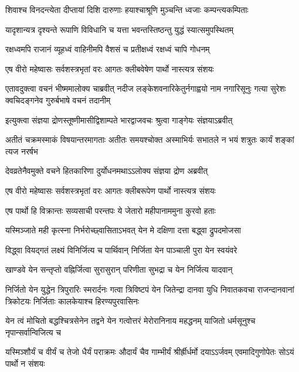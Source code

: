 \twolineshloka
{शिवाश्च विनदन्त्येता दीप्तायां दिशि दारुणाः}
{हयाश्चाश्रूणि मुञ्चन्ति ध्वजाः कम्पन्त्यकम्पिताः}


\twolineshloka
{यादृशान्यत्र दृश्यन्ते रूपाणि विविधानि च}
{यत्ता भवन्तस्तिष्ठन्तु युद्धं स्यात्समुपस्थितम्}


\twolineshloka
{रक्षध्वमपि राजानं व्यूहध्वं वाहिनीमपि}
{वैशसं च प्रतीक्षध्वं रक्षध्वं चापि गोधनम्}


\twolineshloka
{एष वीरो महेष्वासः सर्वशस्त्रभृतां वरः}
{आगतः क्लीबवेषेण पार्थो नास्त्यत्र संशयः}


\onelineshloka
{एतावदुक्त्वा वचनं भीष्ममालोक्य चाब्रवीत्}
\twolineshloka
{नदीज लङ्केशवनारिकेतुर्नगाह्वयो नाम नगारिसूनुः}
{गत्या सुरेशः क्वचिदङ्गनेव गुरुर्बभाषे वचनं तदानीम्}



\twolineshloka
{इत्युक्त्वा संज्ञया द्रोणस्तूष्णीमासीद्विशाम्पते}
{भारद्वाजवचः श्रुत्वा गाङ्गेयः संज्ञयाऽब्रवीत्}


\threelineshloka
{अतीतं चक्रमस्माकं विषयान्तरमागताः}
{अतीतः समयश्चोक्त अस्माभिर्यः सभातले}
{न भयं शत्रुतः कार्यं शङ्कां त्यज नरर्षभ}


\twolineshloka
{देवव्रतेनैवमुक्ते वचने हितकारिणा}
{दुर्योधनमथाऽऽलोक्य संज्ञया द्रोण अब्रवीत्}


\twolineshloka
{एष वीरो महेष्वासः सर्वशस्त्रभृतां वरः}
{आगतः क्लीबरूपेण पार्थो नास्त्यत्र संशयः}


\twolineshloka
{एष पार्थो हि विक्रान्तः सव्यसाची परन्तपः}
{ये जेतारो महीपानाममुना कुरवो हताः}


\twolineshloka
{यस्मिञ्जाते मही कृत्स्ना निर्भरोच्छ्वासिताऽभवत्}
{येन मे दक्षिणा दत्ता बद्ध्वा द्रुपदमोजसा}


\twolineshloka
{विद्ध्वा वियद्गतं लक्ष्यं विनिर्जित्य च पार्थिवान्}
{निर्जिता येन पाञ्चाली पुरा येन स्वयंवरे}


\twolineshloka
{खाण्डवे येन सन्तृप्तो वह्निर्जित्वा सुरासुरान्}
{परिणीता सुभद्रा च येन निर्जित्य यादवान्}


\onelineshloka
{निर्जितो येन युद्धेन त्रिपुरारिः स्मरार्दनः}
\threelineshloka
{गत्वा त्रिविष्टपं येन जितेन्द्रा दानवा युधि}
{निवातकवचा राजन्दानवानां त्रिकोटयः}
{निर्जिताः कालकेयाश्च हिरण्यपुरवासिनः}


\onelineshloka
{येन त्वं मोचितो बद्धश्चित्रसेनेन तद्वने}
\twolineshloka
{येन गत्वोत्तरं मेरोरानिनाय महद्धनम्}
{याजितो धर्मसूनुश्च नृपान्सर्वान्विजित्य च}


\threelineshloka
{यस्मिञ्शौर्यं च वीर्यं च तेजो धैर्यं पराक्रमः}
{औदार्यं चैव गाम्भीर्यं श्रीर्ह्रीर्धर्मो दयाऽऽर्जवम्}
{एवमादिगुणोपेतः सोऽयं पार्थो न संशयः}


